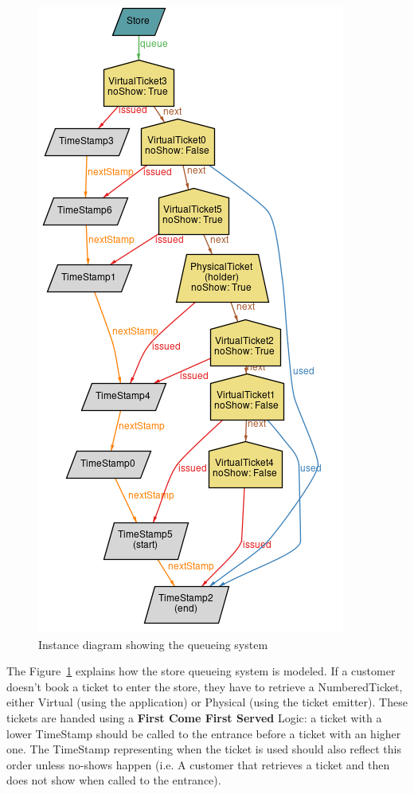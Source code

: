 \begin{figure}[H]
    \hspace*{2.8cm}
    \includegraphics[scale=0.9]{Images/alloy_2_queue.png}
    \caption{\label{fig:Alloy_3}Instance diagram showing the queueing system}
\end{figure}

The Figure~\ref{fig:Alloy_3} explains how the store queueing system is modeled. If a customer doesn't book a ticket to enter the store, they have to retrieve a NumberedTicket, either Virtual (using the application) or Physical (using the ticket emitter). These tickets are handed using a \textbf{First Come First Served} Logic: a ticket with a lower TimeStamp should be called to the entrance before a ticket with an higher one. The TimeStamp representing when the ticket is used should also reflect this order unless no-shows happen (i.e. A customer that retrieves a ticket and then does not show when called to the entrance).